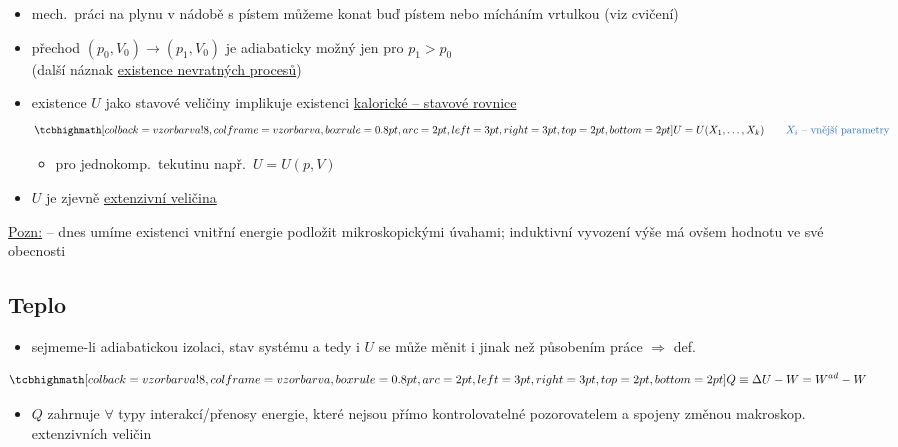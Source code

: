 \begin{priklad}
\begin{itemize}[nosep]
  \item mech.\ práci na plynu v nádobě s pístem můžeme konat buď pístem nebo mícháním vrtulkou (viz cvičení)
  \item[--] přechod $(p_0, V_0)\to(p_1, V_0)$ je adiabaticky možný jen pro $p_1 > p_0$ \\
            (další náznak \underline{existence nevratných procesů})
\end{itemize}
\end{priklad}

\begin{itemize}
  \item existence $U$ jako stavové veličiny implikuje existenci \underline{kalorické -- stavové rovnice}
        \[ \vzorec{U = U(X_1,\dots,X_k)} \qquad \text{\modre{$X_i$ -- vnější parametry}} \]
  \begin{itemize}
    \item[--] pro jednokomp.\ tekutinu např.\ $U = U(p,V)$
  \end{itemize}
  \item $U$ je zjevně \underline{extenzivní veličina}
\end{itemize}

\underline{Pozn:} -- dnes umíme existenci vnitřní energie podložit mikroskopickými úvahami; induktivní vyvození výše má ovšem hodnotu ve své obecnosti

\subsection{Teplo}
\begin{itemize}
  \item sejmeme-li adiabatickou izolaci, stav systému a tedy i $U$ se může měnit i jinak než působením práce $\Rightarrow$ def.\ 
\end{itemize}
\begin{veta}
\[
  \vzorec{Q \equiv \Delta U - W = W^{ad} - W}
\]
\end{veta}
\begin{itemize}
  \item $Q$ zahrnuje $\forall$ typy interakcí/přenosy energie, které nejsou přímo kontrolovatelné pozorovatelem a spojeny změnou makroskop.\  extenzivních veličin
\end{itemize}

